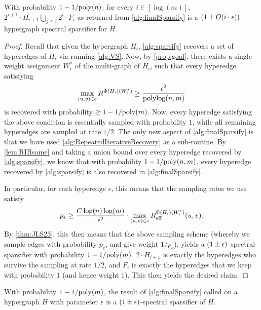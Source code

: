 \documentclass{article}
\begin{document}
\begin{claim}\label{clm:iterativeAccuracy}
    With probability $1 - 1 /\mathrm{poly}(n)$, for every $i \in [\log(m)]$, $2^{i+1} \cdot H_{i+1} \bigcup_{j \leq i} 2^i \cdot F_i$ as returned from \cref{alg:finalSparsify} is a $(1 \pm O(i \cdot \epsilon))$ hypergraph spectral sparsifier for $H$. 
\end{claim}

\begin{proof}
Recall that given the hypergraph $H_i$, \cref{alg:sparsify} recovers a set of hyperedges of $H_i$ via running \cref{alg:VS}. Now, by \cref{prop:goal}, there exists a single weight assignment $W^*_i$ of the multi-graph of $H_i$, such that every hyperedge satisfying 
    \[
    \max_{(u,v) \in e} R^{\Phi(H_i)(W^*_i)} \geq \frac{\epsilon^2}{\operatorname{polylog}(n,m)}
    \]
    is recovered with probability $\geq 1- 1 / \mathrm{poly}(m)$. Now, every hyperedge satisfying the above condition is essentially sampled with probability $1$, while all remaining hyperedges are sampled at rate $1/2$. The only new aspect of \cref{alg:finalSparsify} is that we have used \cref{alg:RepeatedIterativeRecovery} as a sub-routine. By \cref{lem:RIRsame} and taking a union bound over every hyperedge recovered by \cref{alg:sparsify}, we know that with probability $1 - 1 / \mathrm{poly}(n,m)$, every hyperedge recovered by \cref{alg:sparsify} is also recovered in \cref{alg:finalSparsify}.
    
    
    In particular, for each hyperedge $e$, this means that the sampling rates we use satisfy
    \[
    p_e \geq \frac{C \log(n) \log(m)}{ \epsilon^2} \cdot \max_{(u,v) \in e} R_{\mathrm{eff}}^{\Phi(H_i)(W^*_i)}(u,v).
    \]
    By \cref{thm:JLS23}\cite{JambulapatiLS23}, this then means that the above sampling scheme (whereby we sample edges with probability $p_e$, and give weight $1 / p_e$), yields a $(1 \pm \epsilon)$ spectral-sparsifier with probability $1 -1 /\mathrm{poly}(m)$. $2 \cdot H_{i+1}$ is exactly the hyperedges who survive the sampling at rate $1/2$, and $F_i$ is exactly the hyperedges that we keep with probability $1$ (and hence weight $1$). This then yields the desired claim. 
\end{proof}

\begin{lemma}
    With probability $1 - 1 / \mathrm{poly}(m)$, the result of \cref{alg:finalSparsify} called on a hypergraph $H$ with parameter $\epsilon$ is a $(1 \pm \epsilon)$-spectral sparsifier of $H$. 
\end{lemma}
\end{document}

